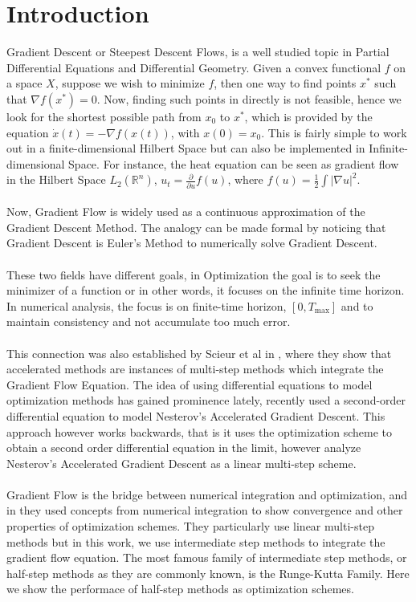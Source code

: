 
\section{Introduction}
Gradient Descent or Steepest Descent Flows, is a
well studied topic in Partial Differential Equations
and Differential Geometry. Given a convex functional $f$ on a
space $X$, suppose we wish to minimize $f$, then one way
to find points $x^*$ such that $\nabla f(x^*) = 0$.
Now, finding such points in directly is not feasible, hence
we look for the shortest possible path from $x_0$ to $x^*$,
which is provided by the equation $\dot{x}(t) = - \nabla f(x(t))$,
with $x(0)=x_0$. This is fairly simple to work out in a
finite-dimensional Hilbert Space but can also be implemented
in Infinite-dimensional Space. For instance, the heat equation
can be seen as gradient flow in the Hilbert Space
$L_2(\mathbb{R}^{n})$, $u_t = \frac{\partial}{\partial u} f(u)$,
where $f(u) = \frac{1}{2} \int |\nabla u|^{2} $.
\\
\\
Now, Gradient Flow is widely used as a continuous
approximation of the Gradient Descent Method. The
analogy can be made formal by noticing that Gradient
Descent is Euler's Method to numerically solve Gradient Descent.
\\
\\
These two fields have different goals, in Optimization
the goal is to seek the minimizer of a function or in
other words, it focuses on the infinite time horizon.
In numerical analysis, the focus is on finite-time
horizon, $[0, T_{\max}]$ and to maintain consistency
and not accumulate too much error.
\\
\\
This connection was also established by Scieur et al
in \cite{integration}, where they show that accelerated
methods are instances of multi-step methods which
integrate the Gradient Flow Equation. The idea of using
differential equations to model optimization methods
has gained prominence lately, recently \cite{su} used a
second-order differential equation to model Nesterov's
Accelerated Gradient Descent. This approach however works
backwards, that is it uses the optimization scheme to
obtain a second order differential equation in the limit,
\cite{integration} however analyze Nesterov's Accelerated
Gradient Descent as a linear multi-step scheme.
\\
\\
Gradient Flow is the bridge between numerical integration
and optimization, and in \cite{integration} they used
concepts from numerical integration to show convergence
and other properties of optimization schemes. They particularly
use linear multi-step methods but in this work, we use
intermediate step methods to integrate the gradient flow
equation. The most famous family of intermediate step
methods, or half-step methods as they are commonly known,
is the Runge-Kutta Family. Here we show the performace of
half-step methods as optimization schemes.

